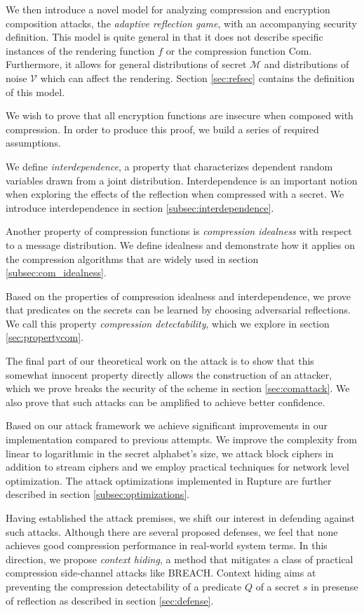 We then introduce a novel model for analyzing compression and encryption
composition attacks, the \textit{adaptive reflection game}, with an accompanying
security definition. This model is quite general in that it does not describe
specific instances of the rendering function $f$ or the compression function
$\textrm{Com}$. Furthermore, it allows for general distributions of secret
$\mathcal{M}$ and distributions of noise $\mathcal{V}$ which can affect the
rendering. Section \ref{sec:refsec} contains the definition of this model.

We wish to prove that all encryption functions are insecure when composed with
compression. In order to produce this proof, we build a series of required
assumptions.

We define \textit{interdependence}, a property that characterizes dependent
random variables drawn from a joint distribution. Interdependence is an
important notion when exploring the effects of the reflection when compressed
with a secret. We introduce interdependence in section
\ref{subsec:interdependence}.

Another property of compression functions is \textit{compression idealness} with
respect to a message distribution. We define idealness and demonstrate how it
applies on the compression algorithms that are widely used in section
\ref{subsec:com_idealness}.

Based on the properties of compression idealness and interdependence, we prove
that predicates on the secrets can be learned by choosing adversarial
reflections. We call this property \textit{compression detectability}, which we
explore in section \ref{sec:propertycom}.

The final part of our theoretical work on the attack is to show that this
somewhat innocent property directly allows the construction of an attacker,
which we prove breaks the security of the scheme in section \ref{sec:comattack}.
We also prove that such attacks can be amplified to achieve better confidence.

Based on our attack framework we achieve significant improvements in our
implementation compared to previous attempts. We improve the complexity from
linear to logarithmic in the secret alphabet's size, we attack block ciphers in
addition to stream ciphers and we employ practical techniques for network level
optimization. The attack optimizations implemented in Rupture are further
described in section \ref{subsec:optimizations}.

Having established the attack premises, we shift our interest in defending
against such attacks. Although there are several proposed defenses, we feel that
none achieves good compression performance in real-world system terms. In this
direction, we propose \textit{context hiding}, a method that mitigates a class
of practical compression side-channel attacks like BREACH. Context hiding aims
at preventing the compression detectability of a predicate $Q$ of a secret $s$
in presense of reflection as described in section \ref{sec:defense}.

